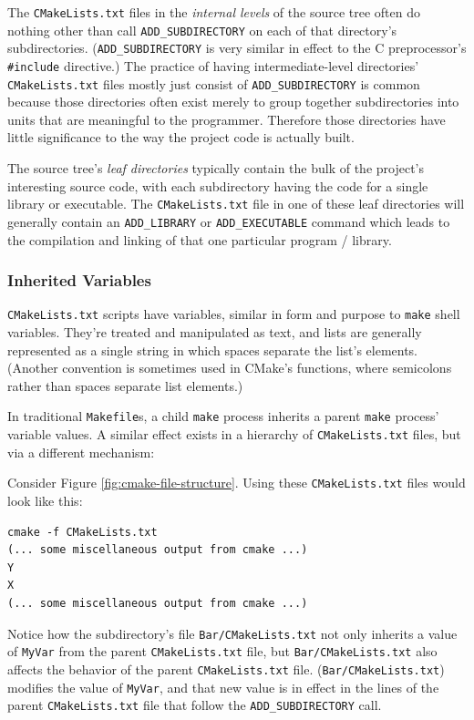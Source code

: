 \documentclass[letterpaper,10pt]{article}
\begin{document}
The \verb|CMakeLists.txt| files
in the \textit{internal levels} of the source tree often do nothing other than call
\verb|ADD_SUBDIRECTORY| on each of that directory's subdirectories.
(\verb|ADD_SUBDIRECTORY| is very
similar in effect to the C preprocessor's \verb|#include| directive.)
The practice of having intermediate-level directories' \verb|CMakeLists.txt|
files mostly just consist of \verb|ADD_SUBDIRECTORY| is common because
those directories often exist merely to group together 
subdirectories into units that are meaningful to the programmer.
Therefore those directories have little significance to the way the 
project code is actually built.

The source tree's \textit{leaf directories} typically contain the bulk of the project's 
interesting source code, with each subdirectory having the code for a single
library or executable.  The \verb|CMakeLists.txt| file in one of these leaf
directories will generally contain an \verb|ADD_LIBRARY| or \verb|ADD_EXECUTABLE|
command which leads to the compilation and linking of that one particular
program / library.

\subsubsection{Inherited Variables}
\verb|CMakeLists.txt| scripts have variables, similar in form and purpose
to \verb|make| shell variables.  They're treated and manipulated as text, and
lists are generally represented as a single string in which spaces separate
the list's elements.  (Another convention is sometimes used in CMake's functions,
where semicolons rather than spaces separate list elements.)

In traditional \verb|Makefile|s, a child \verb|make| process inherits a 
parent \verb|make| process' variable values.  A similar effect exists in
a hierarchy of \verb|CMakeLists.txt| files, but via a different mechanism:

Consider Figure \ref{fig:cmake-file-structure}.  Using these 
\verb|CMakeLists.txt| files would look like this:
\begin{verbatim}
cmake -f CMakeLists.txt
(... some miscellaneous output from cmake ...)
Y
X
(... some miscellaneous output from cmake ...)
\end{verbatim} 

Notice how the subdirectory's file \verb|Bar/CMakeLists.txt| not 
only inherits a value of \verb|MyVar| from the parent \verb|CMakeLists.txt| 
file, but \verb|Bar/CMakeLists.txt| also affects the behavior of the
parent \verb|CMakeLists.txt| file.  (\verb|Bar/CMakeLists.txt|) modifies
the value of \verb|MyVar|, and that new value is in effect in the 
lines of the parent \verb|CMakeLists.txt| file that follow the 
\verb|ADD_SUBDIRECTORY| call.  
\end{document}
